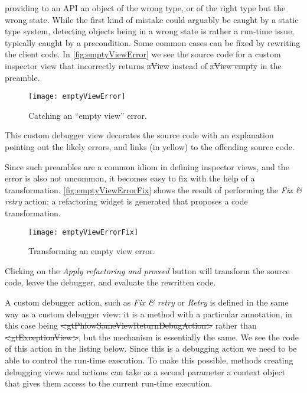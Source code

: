 \documentclass[sigplan,10pt]{acmart}
\newcommand\on[1]{\nbc{ON}{#1}{olive}} %
\newcommand{\GT}{\lst{GT}\xspace} %
\begin{document}
providing to an API an object of the wrong type, or of the right type but the wrong state.
While the first kind of mistake could arguably be caught by a static type system, detecting objects being in a wrong state is rather a run-time issue, typically caught by a precondition.
Some common cases can be fixed by rewriting the client code.
In \autoref{fig:emptyViewError} we see the source code for a custom inspector view that incorrectly returns \st{aView} instead of \st{aView empty} in the preamble.
\begin{figure}[h]
  \texttt{[image: emptyViewError]}
  \caption{Catching an ``empty view'' error.}
  \label{fig:emptyViewError}
\end{figure}
This custom debugger view decorates the source code with an explanation pointing out the likely errors, and links (in yellow) to the offending source code.

\on{AC -- can you answer this?}

Since such preambles are a common idiom in defining \GT inspector views, and the error is also not uncommon, it becomes easy to fix with the help of a transformation.
\autoref{fig:emptyViewErrorFix} shows the result of performing the \emph{Fix \& retry} action: a refactoring widget is generated that proposes a code transformation.
\begin{figure*}[h]
  \texttt{[image: emptyViewErrorFix]}
  \caption{Transforming an empty view error.}
  \label{fig:emptyViewErrorFix}
\end{figure*}
Clicking on the \emph{Apply refactoring and proceed} button will transform the source code, leave the debugger, and evaluate the rewritten code.

A custom debugger action, such as \emph{Fix \& retry} or \emph{Retry} is defined in the same way as a custom debugger view: it is a method with a particular annotation, in this case being \st{<gtPhlowSameViewReturnDebugAction>} rather than \mbox{\st{<gtExceptionView>}}, but  the mechanism is essentially the same.
We see the code of this action in the listing below.
Since this is a debugging action we need to be able to control the run-time execution.
To make this possible, methods creating debugging views and actions can take as a second parameter a context object that gives them access to the current run-time execution.
\end{document}
